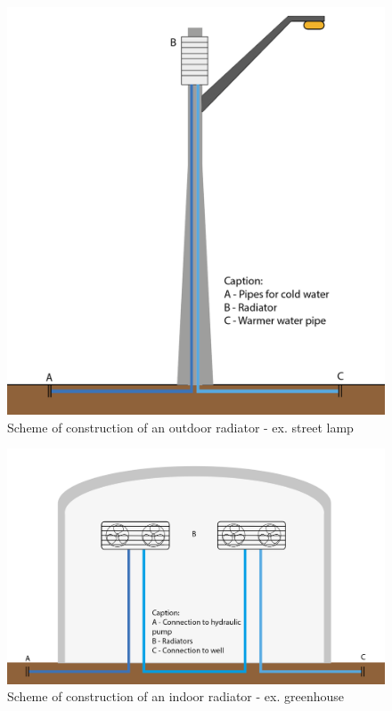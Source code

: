 \begin{figure}[ht]
    \centering
    \includegraphics[scale=0.4]{pictures/poste.png}
    \caption{Scheme of construction of an outdoor radiator - ex. street lamp}
    \label{poste}
\end{figure}

\begin{figure}[ht]
    \centering
    \includegraphics[scale=0.45]{pictures/estufa.png}
    \caption{Scheme of construction of an indoor radiator - ex. greenhouse}
    \label{estufa}
\end{figure}


